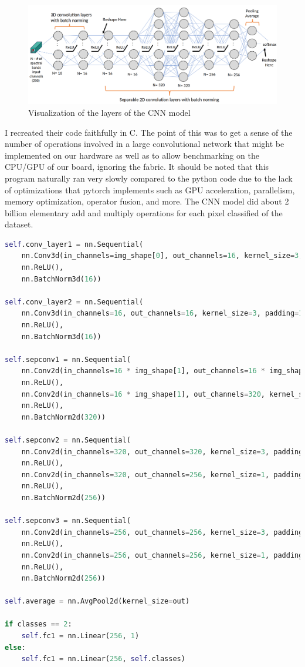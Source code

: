 \documentclass{article}
\begin{document}
\begin{figure}[H]
\centering
\includegraphics[scale=0.2]{cnn_arch.png}
\caption{Visualization of the layers of the CNN model \cite{dirk-presentation}}
\end{figure}

I recreated their code faithfully in C. The point of this was to get a sense of the number of operations involved in a large convolutional network that might be implemented on our hardware as well as to allow benchmarking on the CPU/GPU of our board, ignoring the fabric. It should be noted that this program naturally ran very slowly compared to the python code due to the lack of optimizations that pytorch implements such as GPU acceleration, parallelism, memory optimization, operator fusion, and more. The CNN model did about 2 billion elementary add and multiply operations for each pixel classified of the dataset.

\begin{lstlisting}[language=python]
self.conv_layer1 = nn.Sequential(
    nn.Conv3d(in_channels=img_shape[0], out_channels=16, kernel_size=3, padding=1),
    nn.ReLU(),
    nn.BatchNorm3d(16))

self.conv_layer2 = nn.Sequential(
    nn.Conv3d(in_channels=16, out_channels=16, kernel_size=3, padding=1),
    nn.ReLU(),
    nn.BatchNorm3d(16))

self.sepconv1 = nn.Sequential(
    nn.Conv2d(in_channels=16 * img_shape[1], out_channels=16 * img_shape[1], kernel_size=5, padding=2, groups=16 * img_shape[1]),
    nn.ReLU(),
    nn.Conv2d(in_channels=16 * img_shape[1], out_channels=320, kernel_size=1, padding=0),
    nn.ReLU(),
    nn.BatchNorm2d(320))

self.sepconv2 = nn.Sequential(
    nn.Conv2d(in_channels=320, out_channels=320, kernel_size=3, padding=1, stride=stride, groups=320),
    nn.ReLU(),
    nn.Conv2d(in_channels=320, out_channels=256, kernel_size=1, padding=0),
    nn.ReLU(),
    nn.BatchNorm2d(256))

self.sepconv3 = nn.Sequential(
    nn.Conv2d(in_channels=256, out_channels=256, kernel_size=3, padding=1, stride=stride, groups=256),
    nn.ReLU(),
    nn.Conv2d(in_channels=256, out_channels=256, kernel_size=1, padding=0),
    nn.ReLU(),
    nn.BatchNorm2d(256))

self.average = nn.AvgPool2d(kernel_size=out)

if classes == 2:
    self.fc1 = nn.Linear(256, 1)
else:
    self.fc1 = nn.Linear(256, self.classes)
\end{lstlisting}
\end{document}
